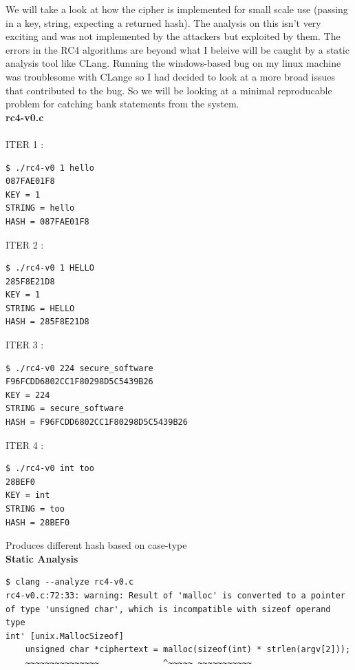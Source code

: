 \documentclass[12pt, letterpaper]{article}
\begin{document}
\begin{sloppypar}
\noindent We will take a look at how the cipher is implemented for small scale use
(passing in a key, string, expecting a returned hash). The analysis on
this isn't very exciting and was not implemented by the attackers but
exploited by them. The errors in the RC4 algorithms are beyond what I
beleive will be caught by a static analysis tool like CLang. Running the
windows-based bug on my linux machine was troublesome with CLange so I
had decided to look at a more broad issues that contributed to the bug.
So we will be looking at a minimal reproducable problem for catching
bank statements from the system. \\

\noindent \textbf{rc4-v0.c}\\
\\
\noindent ITER 1 :

\begin{verbatim}
$ ./rc4-v0 1 hello
087FAE01F8
KEY = 1
STRING = hello
HASH = 087FAE01F8
\end{verbatim}

\noindent ITER 2 :

\begin{verbatim}
$ ./rc4-v0 1 HELLO
285F8E21D8
KEY = 1
STRING = HELLO
HASH = 285F8E21D8
\end{verbatim}

\noindent ITER 3 :

\begin{verbatim}
$ ./rc4-v0 224 secure_software
F96FCDD6802CC1F80298D5C5439B26
KEY = 224
STRING = secure_software
HASH = F96FCDD6802CC1F80298D5C5439B26
\end{verbatim}

\noindent ITER 4 :

\begin{verbatim}
$ ./rc4-v0 int too
28BEF0
KEY = int
STRING = too
HASH = 28BEF0
\end{verbatim}

\noindent Produces different hash based on case-type \\

\noindent \textbf{Static Analysis}

\begin{verbatim}
$ clang --analyze rc4-v0.c
rc4-v0.c:72:33: warning: Result of 'malloc' is converted to a pointer
of type 'unsigned char', which is incompatible with sizeof operand type
int' [unix.MallocSizeof]
    unsigned char *ciphertext = malloc(sizeof(int) * strlen(argv[2]));
    ~~~~~~~~~~~~~~~             ^~~~~~ ~~~~~~~~~~~


\end{verbatim}
\end{sloppypar}
\end{document}
